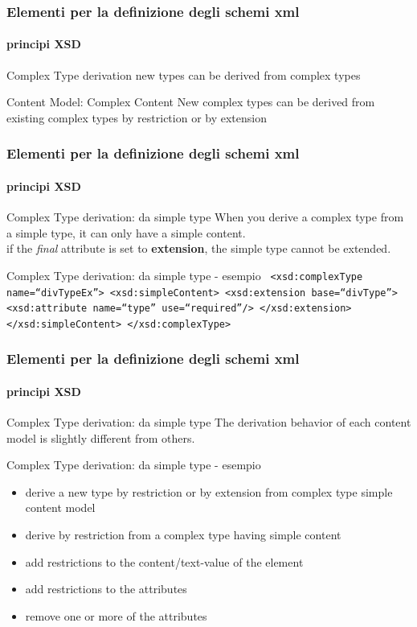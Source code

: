 \begin{frame}
	\frametitle{Elementi per la definizione degli schemi xml}
	\framesubtitle{principi XSD}
	\addtocounter{nframe}{1}

	\begin{block}{Complex Type derivation}
		new types can be derived from complex types
	\end{block}

	\begin{block}{Content Model: Complex Content}
		New complex types can be derived from existing complex types by restriction or by extension
	\end{block}
\end{frame}

\begin{frame}
	\frametitle{Elementi per la definizione degli schemi xml}
	\framesubtitle{principi XSD}
	\addtocounter{nframe}{1}

	\begin{block}{Complex Type derivation: da simple type}
		When you derive a complex type from a simple type, it can only have a simple content.
		\\if the \textit{final} attribute is set to \textbf{extension}, the simple type cannot be extended.

	\end{block}

	\begin{block}{Complex Type derivation: da simple type - esempio}
		\texttt{
			<xsd:complexType name=``divTypeEx''>
			<xsd:simpleContent>
				<xsd:extension base=``divType''>
				<xsd:attribute name=``type'' use=``required''/>
				</xsd:extension>
			</xsd:simpleContent>
			</xsd:complexType>
		}
	\end{block}
\end{frame}

 

\begin{frame}
	\frametitle{Elementi per la definizione degli schemi xml}
	\framesubtitle{principi XSD}
	\addtocounter{nframe}{1}

	\begin{block}{Complex Type derivation: da simple type}
		The derivation behavior of each content model is slightly different from others.
	\end{block}

	\begin{block}{Complex Type derivation: da simple type - esempio}
		\begin{itemize}
			\item derive a new type by restriction or by extension from complex type simple content model
			\item derive by restriction from a complex type having simple content
			\item add restrictions to the content/text-value of the element
			\item add restrictions to the attributes
			\item remove one or more of the attributes
		\end{itemize}
	\end{block}
\end{frame}


